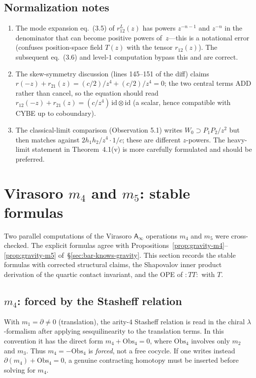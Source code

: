 \documentclass[11pt]{article}
\newcommand{\Ainf}{\mathsf{A}_{\infty}}
\newcommand{\id}{\mathrm{id}}
\newcommand{\normord}[1]{:\!#1\!:}
\begin{document}
\subsection*{Normalization notes}

\begin{enumerate}[label=(E\arabic*)]
\item The mode expansion eq.~(3.5) of $r^L_{12}(z)$ has powers
  $z^{-n-1}$ and $z^{-n}$ in the denominator that can become
  positive powers of~$z$---this is a notational error (confuses
  position-space field $T(z)$ with the tensor $r_{12}(z)$).  The
  subsequent eq.~(3.6) and level-$1$ computation bypass this and
  are correct.
\item The skew-symmetry discussion (lines 145--151 of the diff)
  claims $r(-z) + r_{21}(z) = (c/2)/z^4 + (c/2)/z^4 = 0$; the
  two central terms ADD rather than cancel, so the equation should
  read $r_{12}(-z) + r_{21}(z) = (c/z^4)\,\id \otimes \id$ (a
  scalar, hence compatible with CYBE up to coboundary).
\item The classical-limit comparison (Observation 5.1) writes
  $W_0 \supset P_1 P_2/z^2$ but then matches against $2h_1 h_2/z^4
  \cdot 1/c$; these are different $z$-powers.  The heavy-limit
  statement in Theorem~4.1(v) is more carefully formulated and
  should be preferred.
\end{enumerate}


\section{Virasoro $m_4$ and $m_5$: stable formulas}
\label{sec:virasoro-m4-m5-stable}

Two parallel computations of the Virasoro $\Ainf$ operations
$m_4$ and $m_5$ were cross-checked.  The explicit formulas agree
with Propositions~\ref*{prop:gravity-m4}--\ref*{prop:gravity-m5}
of~\S\ref*{sec:bar-knows-gravity}.  This section records the
stable formulas with corrected structural claims, the
Shapovalov inner product derivation of the quartic contact
invariant, and the OPE of $\normord{TT}$ with $T$.

\subsection{$m_4$: forced by the Stasheff relation}

With $m_1 = \partial \ne 0$ (translation), the arity-$4$ Stasheff
relation is read in the chiral $\lambda$-formalism after applying
sesquilinearity to the translation terms.  In this convention it
has the direct form $m_4+\mathrm{Obs}_4=0$, where
$\mathrm{Obs}_4$ involves only $m_2$ and $m_3$.
Thus $m_4 = -\mathrm{Obs}_4$ is \emph{forced}, not a free cocycle.
If one writes instead $\partial(m_4)+\mathrm{Obs}_4=0$, a genuine
contracting homotopy must be inserted before solving for $m_4$.
\end{document}
